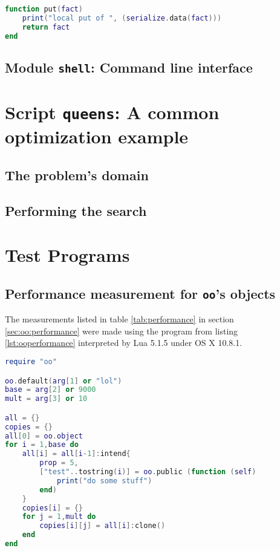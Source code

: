 \begin{appendices}
\begin{lstlisting}[language=lua, caption={The module \texttt{onsite}}, label=lst:onsite, name=lst:onsite]
function put(fact)
	print("local put of ", (serialize.data(fact)))
	return fact
end
\end{lstlisting}

\section{Module \texttt{shell}: Command line interface}

\chapter{Script \texttt{queens}: A common optimization example}
\label{chap:app:queens}

\section{The problem's domain}

\section{Performing the search}

\chapter{Test Programs}

\section{Performance measurement for \texttt{oo}'s objects}
\label{sec:app:ooperformance}

The measurements listed in table \ref{tab:performance} in section \ref{sec:oo:performance} were made using the program from listing \ref{lst:ooperformance} interpreted by Lua 5.1.5 under OS X 10.8.1. 

\begin{lstlisting}[language=lua, caption={Test program for memory measurement of different object types}, label=lst:ooperformance, name=lst:ooperformance]
require "oo"

oo.default(arg[1] or "lol")
base = arg[2] or 9000
mult = arg[3] or 10

all = {}
copies = {}
all[0] = oo.object
for i = 1,base do
	all[i] = all[i-1]:intend{
		prop = 5,
		["test"..tostring(i)] = oo.public (function (self)
			print("do some stuff")
		end)
	}
	copies[i] = {}
	for j = 1,mult do
		copies[i][j] = all[i]:clone()
	end
end


\end{lstlisting}
\end{appendices}
